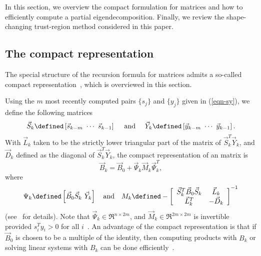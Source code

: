 In this section, we overview the compact formulation for \LBFGS{} matrices
and how to efficiently compute a partial eigendecomposition.  Finally, we
review the shape-changing trust-region method considered in this paper.


\subsection{The compact representation}  
The special structure of the recursion formula for \LBFGS{} matrices
admits a so-called compact representation~\cite{ByrNS94},
which is overviewed in this section.

Using the $m$ most recently computed pairs $\{s_j\}$ and $\{y_j\}$ given
in (\ref{eqn-sy}), we define the following matrices
\begin{equation*}
  \vec{S}_k \defined \left[ \vec{s}_{k-m} \,\, \cdots \,\, \vec{s}_{k-1}\right] \quad \text{ and } \quad \vec{Y}_k \defined \left[ \vec{y}_{k-m} \,\, \cdots \,\, \vec{y}_{k-1}\right].
\end{equation*}
With $\vec{L}_k$ taken to be the strictly lower triangular part of the matrix
of $ \vec{S}^T_k \vec{Y}_k
$,
and $ \vec{D}_k $ defined as the diagonal of $ \vec{S}^T_k \vec{Y}_k
$,
the compact representation of an \LBFGS{} matrix is
\begin{equation}
	\label{eq:comactlbfgs}
	\vec{B}_k = \vec{B}_0 + \vec{\Psi}_k \vec{M}_k \vec{\Psi}^T_k,
\end{equation}
where 
\begin{equation}\label{eqn-PsiM}
\Psi_k\defined
 \left[ \vec{B}_0\vec{S}_k \,\, \vec{Y}_k\right] \quad
\text{and} \quad
M_k\defined 
	-\left[ 
\begin{array}{c c}
\vec{S}^T_k\vec{B}_0 	\vec{S}_k 			& \vec{L}_k \\
	\vec{L}^T_k 								& -\vec{D}_k
\end{array}
\right]^{-1}
\end{equation}
(see~\cite{ByrNS94} for details).  Note that $ \vec{\Psi}_k \in \Re^{n
  \times 2m} $, and $ \vec{M}_k \in \Re^{2m \times 2m} $ is invertible
provided $s_i^Ty_i > 0$ for all $i$~\cite[Theorem 2.3]{ByrNS94}.  An
advantage of the compact representation is that if $ \vec{B}_0 $ is
chosen to be a multiple of the identity, then computing products
with $B_k$ or solving linear systems with $B_k$ can be done efficiently~\cite{ErwayMarcia17LAA,LukV13}.

